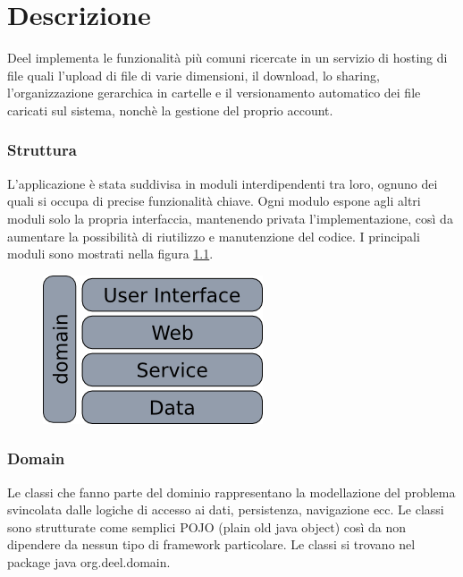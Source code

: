 
\chapter{Descrizione}



Deel implementa le funzionalità più comuni ricercate in un servizio di
hosting di file quali l'upload di file di varie dimensioni, il
download, lo sharing, l'organizzazione gerarchica in cartelle e il
versionamento automatico dei file caricati sul sistema, nonchè la gestione del
proprio account.

\subsection{Struttura}



L'applicazione è stata suddivisa in moduli interdipendenti tra loro,
ognuno dei quali si occupa di precise funzionalità chiave. Ogni modulo
espone agli altri moduli  solo
la propria interfaccia, mantenendo privata l'implementazione, così da aumentare
la possibilità di riutilizzo e manutenzione del codice. 
I principali moduli sono mostrati nella figura \ref{arc}. 

\begin{figure}
\center
  \includegraphics{architecture}
\caption{}
  \label{arc}
\end{figure}


\subsection{Domain}
Le classi che fanno parte del dominio rappresentano la  modellazione del
problema svincolata dalle logiche di accesso ai dati, persistenza,
navigazione ecc. Le classi sono strutturate come semplici POJO (plain
old java object) così da non dipendere da nessun tipo di framework
particolare. Le classi si trovano nel package java org.deel.domain.


